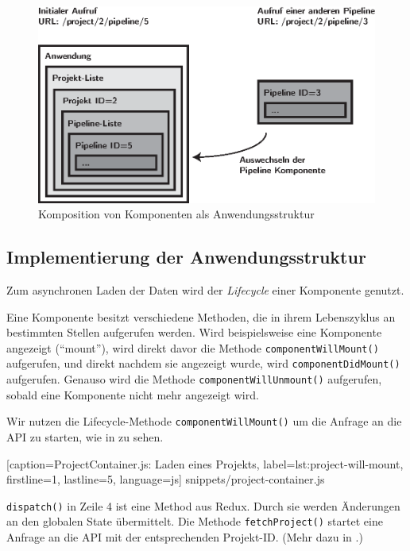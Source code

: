 \begin{figure}[h]
  \caption{Komposition von Komponenten als Anwendungsstruktur}
  \label{fig:komposition}
  \centering
    \includegraphics[width=\textwidth]{assets/komposition}
\end{figure}

\subsection{Implementierung der Anwendungsstruktur}
\label{subsec:implementierung-struktur}

Zum asynchronen Laden der Daten wird der \emph{Lifecycle} einer Komponente genutzt.

Eine Komponente besitzt verschiedene Methoden, die in ihrem Lebenszyklus an bestimmten Stellen aufgerufen werden. Wird beispielsweise eine Komponente angezeigt (``mount''), wird direkt davor die Methode \texttt{componentWillMount()} aufgerufen, und direkt nachdem sie angezeigt wurde, wird \texttt{componentDidMount()} aufgerufen. Genauso wird die Methode \texttt{componentWillUnmount()} aufgerufen, sobald eine Komponente nicht mehr angezeigt wird. \citep[State and Lifecycle]{ReactDocs}

Wir nutzen die Lifecycle-Methode \texttt{componentWillMount()} um die Anfrage an die API zu starten, wie in  zu sehen.


  [caption={ProjectContainer.js: Laden eines Projekts},
  label={lst:project-will-mount},
  firstline=1,
  lastline=5,
  language=js]
  {snippets/project-container.js}

\texttt{dispatch()} in Zeile 4 ist eine Method aus Redux. Durch sie werden Änderungen an den globalen State übermittelt. Die Methode \texttt{fetchProject()} startet eine Anfrage an die API mit der entsprechenden Projekt-ID. (Mehr dazu in .)

